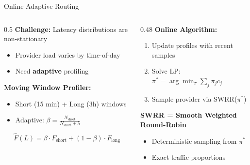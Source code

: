 \documentclass[aspectratio=169,10pt]{beamer}
\begin{document}
\begin{frame}{Online Adaptive Routing}
\vspace{-0.3cm}
\begin{columns}[T]
\begin{column}{0.5\textwidth}
\footnotesize
\textbf{Challenge:} Latency distributions are \alert{non-stationary}
\begin{itemize}\setlength{\itemsep}{0pt}
    \item Provider load varies by time-of-day
    \item Need \textbf{adaptive} profiling
\end{itemize}

\vspace{0.15cm}
\textbf{Moving Window Profiler:}
\begin{itemize}\setlength{\itemsep}{0pt}
    \item Short (15 min) + Long (3h) windows
    \item Adaptive: $\beta = \frac{N_{\text{short}}}{N_{\text{short}} + \lambda}$
\end{itemize}
\[
\hat{F}(L) = \beta \cdot F_{\text{short}} + (1-\beta) \cdot F_{\text{long}}
\]
\end{column}

\begin{column}{0.48\textwidth}
\footnotesize
\textbf{Online Algorithm:}
\begin{enumerate}\setlength{\itemsep}{0pt}
    \item Update profiles with recent samples
    \item Solve LP: $\pi^* = \arg\min_\pi \sum_j \pi_j c_j$
    \item Sample provider via SWRR($\pi^*$)
\end{enumerate}

\vspace{0.15cm}
\textbf{SWRR = Smooth Weighted Round-Robin}
\begin{itemize}\setlength{\itemsep}{0pt}
    \item Deterministic sampling from $\pi^*$
    \item Exact traffic proportions
\end{itemize}
\end{column}
\end{columns}
\end{frame}
\end{document}
